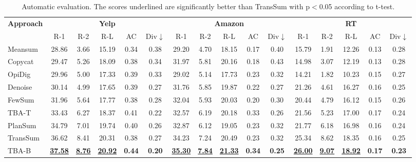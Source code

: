 \begin{table}[t]
	\centering
	\begin{tabular}{|l|ccccc|ccccc|ccccc|}
		\hline
		\multirow{2}{*}{\bf Approach} & \multicolumn{5}{c|}{\bf Yelp} &  \multicolumn{5}{c|}{\bf Amazon} & \multicolumn{5}{c|}{\bf RT} \\ \cline{2-16}
		& R-1 & R-2 & R-L& AC &Div$\downarrow$ & R-1 & R-2 & R-L& AC & Div$\downarrow$ & R-1 & R-2 & R-L& AC & Div$\downarrow$\\
		\hline
		Meansum & 28.86 & 3.66 & 15.19 & 0.34 & 0.38 &  29.20 &4.70 & 18.15& 0.17& 0.40 & 15.79 & 1.91 & 12.26 & 0.13 & 0.28 \\
		Copycat & 29.47 & 5.26 &18.09& 0.38 & 0.34 & 31.97 & 5.81 &20.16  & 0.18 & 0.43 & 14.98 & 3.07 & 12.19 & 0.13 & 0.28 \\
		OpiDig & 29.96 &5.00 & 17.33& 0.39 & 0.33 & 29.02 & 5.14 & 17.73 & 0.23 & 0.32 & 14.21 & 1.82& 10.23 & 0.15& 0.27 \\
		Denoise & 30.14 & 4.99 & 17.65& 0.39 & 0.27 &31.76 & 5.85 & 19.87 & 0.22 & 0.27 & 21.26 & 4.61& 16.27& 0.16& 0.25 \\
		FewSum
		& 31.96 & 5.64 & 17.77 & 0.38 & 0.28 & 32.04 & 5.93 & 20.03 & 0.20 & 0.30& 20.44& 4.79& 16.12 & 0.15& 0.26\\
		TBA-T & 33.43 & 6.27 & 18.37& 0.41 & 0.22 & 32.57 & 6.19 & 20.18 & 0.33 & 0.26& 21.56&5.23 & 17.00& 0.17& 0.24\\
		\hline
		PlanSum & 34.79&7.01 &19.74 &0.40 & 0.26 & 32.87 &6.12 & 19.05 & 0.23 & 0.32 & 21.77& 6.18 & 16.98 & 0.16 & 0.24 \\
		TransSum & 36.62&8.41 &20.31 &0.38 & 0.27 & 34.23& 7.24 & 20.49 & 0.23 & 0.32 & 25.34& 8.62& 18.35& 0.16 & 0.25\\
		TBA-B & \underline{\bf 37.58} & \underline{\bf 8.76} & \underline{\bf 20.92} & \bf 0.44 & \bf 0.20 & \underline{\bf 35.30} & \underline{\bf 7.84} & \underline{\bf 21.33} & \bf 0.34 & \bf 0.25 & \underline{\bf 26.00}& \underline{\bf 9.07}& \underline{\bf 18.92}& \bf 0.17& \bf 0.23\\
		\hline
	\end{tabular}
	\caption{Automatic evaluation. 
		The scores underlined are significantly better than TransSum  with p$<$0.05 according to t-test.
	}\label{tab:all}  
\end{table}

